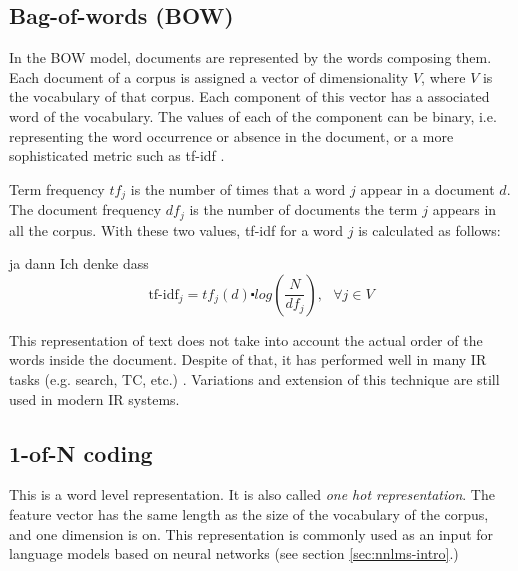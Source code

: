 
 \subsection{Bag-of-words (BOW)}
 \label{sec:rel_bow}

In the \ac{BOW} model, documents are represented by the words composing them.
Each document of a corpus is assigned a vector of dimensionality $V$, where $V$ is the
vocabulary of that corpus. Each component of this vector has a associated word of
the vocabulary. The values of each of the component can be binary, i.e. representing the
word occurrence or absence in the document, or a more sophisticated metric
such as \ac{tf-idf} \cite{Salton88term-weightingapproaches}.

Term frequency $tf_j$  is the number of times that a word $j$ appear in a
document $d$. The document frequency  $df_{j}$  is the number of documents
the term $j$ appears in all the corpus.  With these two values,  \ac{tf-idf}  for a  word $j$ is  calculated as follows:

ja dann Ich denke dass \begin{equation*}
  \label{eq:tf-idf}
  \text{tf-idf}_{j}=tf_{j}(d)\centerdot log(\frac{N}{df_{j}}),\,\,\,\,\forall
  j \in V
\end{equation*}

This representation of text does not take  into account the actual order of the words inside the document. Despite
of that, it has  performed well in many \ac{IR} tasks (e.g. search, \ac{TC},
etc.) \cite{Sebastiani02}. Variations and extension of this technique are
still used in modern \ac{IR} systems.

 \subsection{1-of-N coding}
 \label{sec:1_of_coding}

 This is a word level representation. It is also called \textit{one hot
   representation}. The feature vector has the same length as the size of the
 vocabulary of the corpus, and  one dimension is on.  This representation is
 commonly used as an input for language models based on neural networks (see
 section \ref{sec:nnlms-intro}.)


